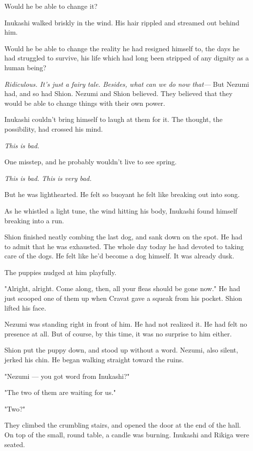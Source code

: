 Would he be able to change it?

Inukashi walked briskly in the wind. His hair rippled and streamed out
behind him.

Would he be able to change the reality he had resigned himself to, the
days he had struggled to survive, his life which had long been stripped
of any dignity as a human being?

\emph{Ridiculous. It's just a fairy tale. Besides, what can we do now that---}
But Nezumi had, and so had Shion. Nezumi and Shion believed. They
believed that they would be able to change things with their own power.

Inukashi couldn't bring himself to laugh at them for it. The thought,
the possibility, had crossed his mind.

\emph{This is bad.}

One misstep, and he probably wouldn't live to see spring.

\emph{This is bad. This is very bad.}

But he was lighthearted. He felt so buoyant he felt like breaking out
into song.

As he whistled a light tune, the wind hitting his body, Inukashi found
himself breaking into a run.

\mybreak

Shion finished neatly combing the last dog, and sank down on the spot.
He had to admit that he was exhausted. The whole day today he had
devoted to taking care of the dogs. He felt like he'd become a dog
himself. It was already dusk.

The puppies nudged at him playfully.

"Alright, alright. Come along, then, all your fleas should be gone now."
He had just scooped one of them up when Cravat gave a squeak from his
pocket. Shion lifted his face.

Nezumi was standing right in front of him. He had not realized it. He
had felt no presence at all. But of course, by this time, it was no
surprise to him either.

Shion put the puppy down, and stood up without a word. Nezumi, also
silent, jerked his chin. He began walking straight toward the ruins.

"Nezumi --- you got word from Inukashi?"

"The two of them are waiting for us."

"Two?"

They climbed the crumbling stairs, and opened the door at the end of the
hall. On top of the small, round table, a candle was burning. Inukashi
and Rikiga were seated.

